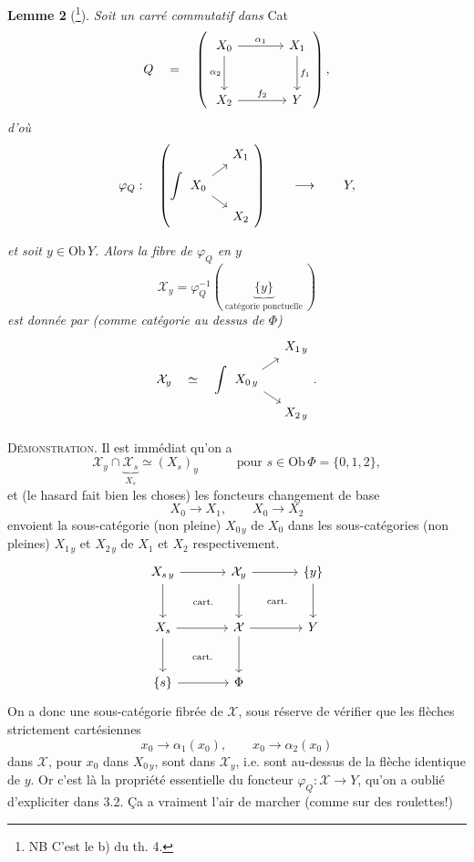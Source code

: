 \documentclass[11pt]{article}
\newcommand{\printedpage}[1]{\marginpar{\footnotesize p.~#1}}
\newcommand{\msp}[1]{\marginpar{\footnotesize [#1]}}
\newcommand{\intdiag}[3]{\int\begin{tikzcd}[row sep=small,column sep=small,ampersand replacement=\&,baseline=(\tikzcdmatrixname-2-1.base)] \& #2 \\ #1 \arrow[ur]\arrow[dr] \& \\ \& #3 \end{tikzcd}}
\begin{document}
\noindent\textbf{Lemme 2} (\footnote[106]{NB C'est le b) du th. 4.}). \textit{Soit un carré commutatif dans} Cat
\[
Q \quad = \quad
\left(
\begin{tikzcd}[row sep=large,column sep=large]
X_0 \arrow[r, "\alpha_1"] \arrow[d, "\alpha_2"'] & X_1 \arrow[d, "f_1"] \\
X_2 \arrow[r, "f_2"] & Y
\end{tikzcd}
\right),
\]
\textit{d'où}
\[
\varphi_Q : \quad \left( \intdiag{X_0}{X_1}{X_2} \right) \qquad\longrightarrow\qquad Y,
\]

\msp{page 155}
\textit{et soit $y\in\mathrm{Ob}\,Y$. Alors la fibre de $\varphi_Q$ en $y$}
\[
\mathcal{X}_y = \varphi_Q^{-1}(\ \underbrace{\{y\}}_{\text{catégorie ponctuelle}}\ )
\]
\textit{est donnée par (comme catégorie au dessus de $\Phi$)}
\[
\mathcal{X}_y \quad\simeq\quad \intdiag{X_{0\,y}}{X_{1\,y}}{X_{2\,y}} .
\]

\noindent\textsc{Démonstration.} Il est immédiat qu'on a
\[
\mathcal{X}_y\cap\underbrace{\mathcal{X}_s}_{X_s}\simeq(X_s)_y \qquad\quad \text{pour } s\in\mathrm{Ob}\,\Phi=\{0,1,2\},
\]
\printedpage{107}
et (le hasard fait bien les choses) les foncteurs changement de base
\[
X_0\longrightarrow X_1, \qquad X_0\longrightarrow X_2
\]
envoient la sous-catégorie (non pleine) $X_{0\,y}$ de $X_0$ dans les sous-catégories (non pleines) $X_{1\,y}$ et $X_{2\,y}$ de $X_1$ et $X_2$ respectivement.
\[
\begin{tikzcd}[row sep=large,column sep=large]
X_{s\,y} \arrow[r] \arrow[d] \arrow[dr, phantom, "\scriptstyle\text{cart.}"] & \mathcal{X}_y \arrow[r] \arrow[d] \arrow[dr, phantom, "\scriptstyle\text{cart.}"] & \{y\} \arrow[d] \\
X_s \arrow[r] \arrow[d] \arrow[dr, phantom, "\scriptstyle\text{cart.}"] & \mathcal{X} \arrow[r] \arrow[d] & Y \\
\{s\} \arrow[r] & \Phi &
\end{tikzcd}
\]
On a donc une sous-catégorie fibrée de $\mathcal{X}$, sous réserve de vérifier que les flèches strictement cartésiennes
\[
x_0\longrightarrow\alpha_1(x_0), \qquad x_0\longrightarrow\alpha_2(x_0)
\]
dans $\mathcal{X}$, pour $x_0$ dans $X_{0\,y}$, sont dans $\mathcal{X}_y$, i.e. sont au-dessus de la flèche identique de $y$. Or c'est là la propriété essentielle
\msp{page 156}
du foncteur $\varphi_Q : \mathcal{X}\longrightarrow Y$, qu'on a oublié d'expliciter dans 3.2. Ça a vraiment l'air de marcher (comme sur des roulettes!)
\end{document}
